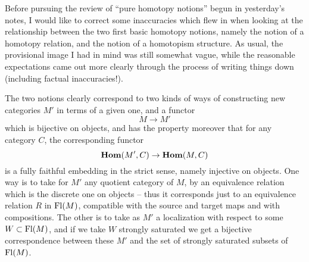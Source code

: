 \bigbreak
\noindent\hfill{}\par

\label{sec:52}%
Before pursuing the review of ``pure homotopy notions'' begun in
yesterday's notes, I would like to correct some inaccuracies which
flew in when looking at the relationship between the two first basic
homotopy notions, namely the notion of a homotopy relation, and the
notion of a homotopism structure. As usual, the provisional image I
had in mind was still somewhat vague, while the reasonable
expectations came out more clearly through the process of writing
things down (including factual inaccuracies!).

The two notions clearly correspond to two kinds of ways of
constructing new categories $M'$ in terms of a given one, and a
functor
\[ M \to M'\]
which is bijective on objects, and has the property moreover that for
any category $C$, the corresponding functor
\[\operatorname{\mathbf{Hom}}(M',C) \to \operatorname{\mathbf{Hom}}(M,C)\]
is a fully faithful embedding in the strict sense, namely injective
on objects. One way is to take for $M'$ any quotient
category of $M$, by an equivalence relation which is the discrete one
on objects -- thus it corresponds just to an equivalence relation $R$
in $\operatorname{Fl}(M)$, compatible with the source and target maps and with
compositions. The other is to take as $M'$ a localization with respect
to some $W\subset\operatorname{Fl}(M)$, and if we take $W$ strongly saturated we get
a bijective correspondence between these $M'$ and the set of strongly
saturated subsets of $\operatorname{Fl}(M)$.

